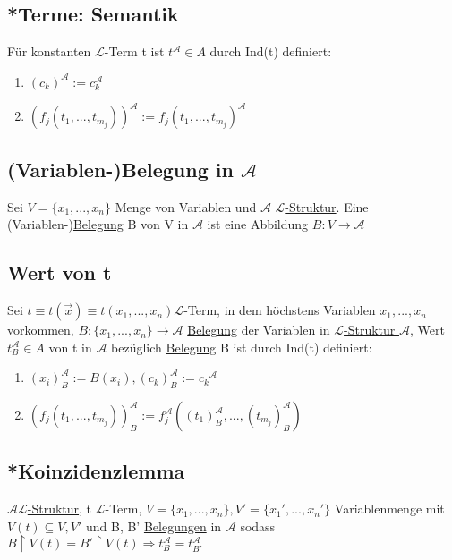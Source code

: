 \documentclass[12pt,a4paper]{article} %
\begin{document}
	\subsection{*Terme: Semantik}
	Für konstanten $\mathcal{L}$-Term t ist $t^{\mathcal{A}} \in A$ durch Ind(t) definiert:
	\begin{enumerate}
		\item $(c_k)^{\mathcal{A}} := c_k^{\mathcal{A}}$
		\item $(f_j(t_1, ..., t_{m_j}))^{\mathcal{A}} := f_j(t_1, ..., t_{m_j})^{\mathcal{A}}$
	\end{enumerate}

	\subsection{(Variablen-)Belegung in $\mathcal{A}$}
	Sei $V = \{x_1, ..., x_n\}$ Menge von Variablen und $\mathcal{A}$ \hyperref[Struktur]{$\mathcal{L}$-Struktur}. \newline
	Eine (Variablen-)\hyperref[Belegung]{Belegung} B von V in $\mathcal{A}$ ist eine Abbildung $B: V \rightarrow \mathcal{A}$ 
	
	\subsection{Wert von t}
	Sei $t \equiv t(\overrightarrow{x}) \equiv t(x_1, ..., x_n) \mathcal{L}$-Term, in dem höchstens Variablen $x_1, ..., x_n$ vorkommen, $B: \{x_1, ..., x_n\} \rightarrow \mathcal{A}$ \hyperref[Belegung]{Belegung} der Variablen in \hyperref[Struktur]{$\mathcal{L}$-Struktur $\mathcal{A}$}, Wert $t_B^{\mathcal{A}} \in A$ von t in $\mathcal{A}$ bezüglich \hyperref[Belegung]{Belegung} B ist durch Ind(t) definiert: 
	\begin{enumerate}
		\item $(x_i)_B^{\mathcal{A}} := B(x_i), (c_k)_B^{\mathcal{A}} := {c_k}^{\mathcal{A}}$
		\item $(f_j(t_1, ..., t_{m_j}))_B^{\mathcal{A}} := f_j^{\mathcal{A}}((t_1)_B^{\mathcal{A}}, ..., (t_{m_j})_B^{\mathcal{A}})$
	\end{enumerate}

	\subsection{*Koinzidenzlemma}
	\hyperref[Struktur]{$\mathcal{A} \mathcal{L}$-Struktur}, t $\mathcal{L}$-Term, $V = \{x_1, ..., x_n\}, V' = \{x_1', ..., x_n'\}$ Variablenmenge mit $V(t)\subseteq V, V'$ und B, B' \hyperref[Belegung]{Belegungen} in $\mathcal{A}$ sodass $B \upharpoonright V(t) = B' \upharpoonright V(t) \Rightarrow t_B^{\mathcal{A}} = t_{B'}^{\mathcal{A}}$
	
\end{document}
